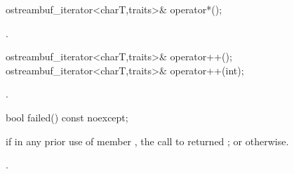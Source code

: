 %
\begin{itemdecl}
ostreambuf_iterator<charT,traits>& operator*();
\end{itemdecl}

\begin{itemdescr}
\pnum
\returns
{}.
\end{itemdescr}

%
\begin{itemdecl}
ostreambuf_iterator<charT,traits>& operator++();
ostreambuf_iterator<charT,traits>& operator++(int);
\end{itemdecl}

\begin{itemdescr}
\pnum
\returns
{}.
\end{itemdescr}

%
\begin{itemdecl}
bool failed() const noexcept;
\end{itemdecl}

\begin{itemdescr}
\pnum
\returns
{}
if in any prior use of member
,
the call to
returned
;
or
otherwise.

\begin{addedblock}
\pnum
\requires {}.
\end{addedblock}
\end{itemdescr}

